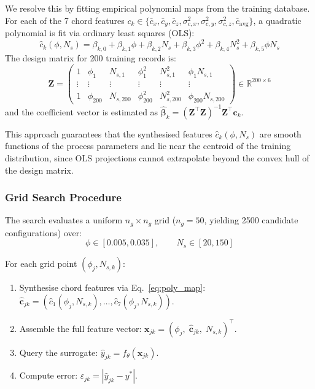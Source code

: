\documentclass[11pt,a4paper]{article}
\begin{document}
We resolve this by fitting empirical polynomial maps from the training database. For each of the 7 chord features $c_k \in \{\bar{c}_x, \bar{c}_y, \bar{c}_z, \sigma^2_{c,x}, \sigma^2_{c,y}, \sigma^2_{c,z}, \bar{c}_{\text{avg}}\}$, a quadratic polynomial is fit via ordinary least squares (OLS):
\begin{equation}
    \hat{c}_k(\phi, N_s) = \beta_{k,0} + \beta_{k,1}\phi + \beta_{k,2}N_s + \beta_{k,3}\phi^2 + \beta_{k,4}N_s^2 + \beta_{k,5}\phi N_s
    \label{eq:poly_map}
\end{equation}
The design matrix for 200 training records is:
\begin{equation}
    \mathbf{Z} = \begin{pmatrix}
        1 & \phi_1 & N_{s,1} & \phi_1^2 & N_{s,1}^2 & \phi_1 N_{s,1} \\
        \vdots & \vdots & \vdots & \vdots & \vdots & \vdots \\
        1 & \phi_{200} & N_{s,200} & \phi_{200}^2 & N_{s,200}^2 & \phi_{200} N_{s,200}
    \end{pmatrix} \in \mathbb{R}^{200 \times 6}
\end{equation}
and the coefficient vector is estimated as $\hat{\bm{\beta}}_k = (\mathbf{Z}^\top \mathbf{Z})^{-1} \mathbf{Z}^\top \mathbf{c}_k$.

This approach guarantees that the synthesised features $\hat{c}_k(\phi, N_s)$ are smooth functions of the process parameters and lie near the centroid of the training distribution, since OLS projections cannot extrapolate beyond the convex hull of the design matrix.

\subsubsection{Grid Search Procedure}

The search evaluates a uniform $n_g \times n_g$ grid ($n_g = 50$, yielding 2500 candidate configurations) over:
\begin{equation}
    \phi \in [0.005, 0.035], \qquad N_s \in [20, 150]
\end{equation}

For each grid point $(\phi_j, N_{s,k})$:
\begin{enumerate}
    \item Synthesise chord features via Eq.~\eqref{eq:poly_map}: $\hat{\mathbf{c}}_{jk} = (\hat{c}_1(\phi_j, N_{s,k}), \ldots, \hat{c}_7(\phi_j, N_{s,k}))$.
    \item Assemble the full feature vector: $\mathbf{x}_{jk} = (\phi_j,\; \hat{\mathbf{c}}_{jk},\; N_{s,k})^\top$.
    \item Query the surrogate: $\hat{y}_{jk} = f_\theta(\mathbf{x}_{jk})$.
    \item Compute error: $\varepsilon_{jk} = |\hat{y}_{jk} - y^*|$.
\end{enumerate}
\end{document}

